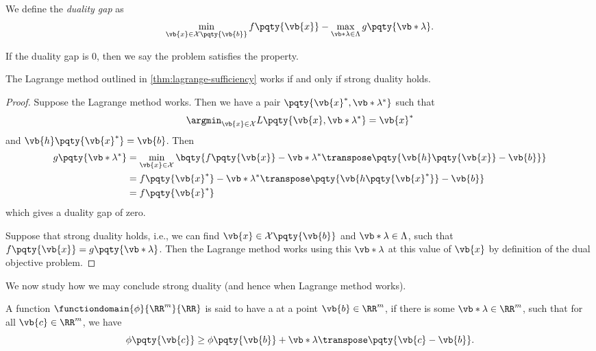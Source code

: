 \begin{definition}
    We define the \textit{duality gap} as
    \[
        \min_{\vb{x} \in \mathcal{X} \pqty{\vb{b}}} f\pqty{\vb{x}} - \max_{\vb*{\lambda} \in \Lambda} g\pqty{\vb*{\lambda}}.
    \]

    If the duality gap is \(0\), then we say the problem satisfies the  property.
\end{definition}

\begin{proposition}
    The Lagrange method outlined in \autoref{thm:lagrange-sufficiency} works if and only if strong duality holds.
\end{proposition}

\begin{proof}
    Suppose the Lagrange method works. Then we have a pair \(\pqty{\vb{x}^{\ast}, \vb*{\lambda}^{\ast}}\) such that
    \[
        \argmin_{\vb{x} \in \mathcal{X}} L \pqty{\vb{x}, \vb*{\lambda}^{\ast}} = \vb{x}^{\ast}
    \]
    and \(\vb{h}\pqty{\vb{x}^{\ast}} = \vb{b}\). Then
    \begin{align*}
        g\pqty{\vb*{\lambda}^{\ast}} &= \min_{\vb{x} \in \mathcal{X}} \bqty{f\pqty{\vb{x}} - {\vb*{\lambda}^{\ast}}\transpose \pqty{\vb{h}\pqty{\vb{x}} - \vb{b}}} \\
        &= f\pqty{\vb{x}^{\ast}} - {\vb*{\lambda}^{\ast}}\transpose \pqty{\vb{h\pqty{\vb{x}^{\ast}}} - \vb{b}} \\
        &= f\pqty{\vb{x}^{\ast}}
    \end{align*}
    which gives a duality gap of zero.

    Suppose that strong duality holds, i.e., we can find \(\vb{x} \in \mathcal{X}\pqty{\vb{b}}\) and \(\vb*{\lambda} \in \Lambda\), such that \(f\pqty{\vb{x}} = g\pqty{\vb*{\lambda}}\). Then the Lagrange method works using this \(\vb*{\lambda}\) at this value of \(\vb{x}\) by definition of the dual objective problem.
\end{proof}

We now study how we may conclude strong duality (and hence when Lagrange method works).

\begin{definition}
    A function \(\functiondomain{\phi}{\RR^m}{\RR}\) is said to have a  at a point \(\vb{b} \in \RR^m\), if there is some \(\vb*{\lambda} \in \RR^m\), such that for all \(\vb{c} \in \RR^m\), we have
    \[
        \phi\pqty{\vb{c}} \geq \phi\pqty{\vb{b}} + \vb*{\lambda}\transpose \pqty{\vb{c} - \vb{b}}.
    \]
\end{definition}

